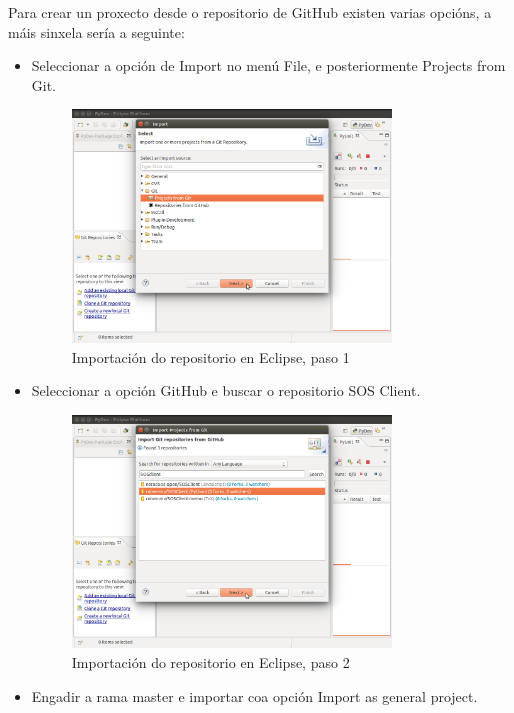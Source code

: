 Para crear un proxecto desde o repositorio de GitHub existen varias opcións, a máis sinxela sería a seguinte:
\begin{itemize}
\item Seleccionar a opción de Import no menú File, e posteriormente Projects from Git.
\begin{figure}[H]
\centering
\includegraphics[width=0.8\textwidth]{images/manualtecnico/import_project01.png}
\caption{Importación do repositorio en Eclipse, paso 1}
\label{fig:import_project01}
\end{figure}
\item Seleccionar a opción GitHub e buscar o repositorio SOS Client.
\begin{figure}[H]
\centering
\includegraphics[width=0.8\textwidth]{images/manualtecnico/import_project02.png}
\caption{Importación do repositorio en Eclipse, paso 2}
\label{fig:import_project02}
\end{figure}
\item Engadir a rama master e importar coa opción Import as general project.
\begin{figure}[H]

\end{figure}
\end{itemize}
